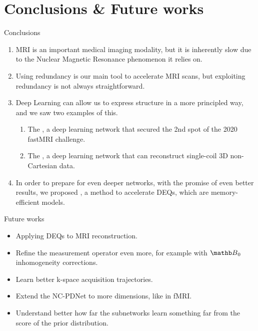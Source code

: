 \documentclass[aspectratio=169,xcolor=dvipsnames]{beamer}
\begin{document}

% 

% 



\section{Conclusions \& Future works}

\begin{frame}{Conclusions}
    \begin{enumerate}[<+->]
        \item MRI is an important medical imaging modality, but it is inherently slow due to the Nuclear Magnetic Resonance phenomenon it relies on.
        \item Using redundancy is our main tool to accelerate MRI scans, but exploiting redundancy is not always straightforward.
        \item Deep Learning can allow us to express structure in a more principled way, and we saw two examples of this.
        \begin{enumerate}[<+->]
            \item The , a deep learning network that secured the 2nd spot of the 2020 fastMRI challenge.
            \item The , a deep learning network that can reconstruct single-coil 3D non-Cartesian data.
        \end{enumerate}
        \item In order to prepare for even deeper networks, with the promise of even better results, we proposed , a method to accelerate DEQs, which are memory-efficient models.
    \end{enumerate}
\end{frame}

\begin{frame}{Future works}
    \begin{itemize}
        \item Applying DEQs to MRI reconstruction.
        \item Refine the measurement operator even more, for example with $\Bb_0$ inhomogeneity corrections.
        \item Learn better k-space acquisition trajectories.
        \item Extend the NC-PDNet to more dimensions, like in fMRI.
        \item Understand better how far the subnetworks learn something far from the score of the prior distribution.
    \end{itemize}
\end{frame}
\end{document}
